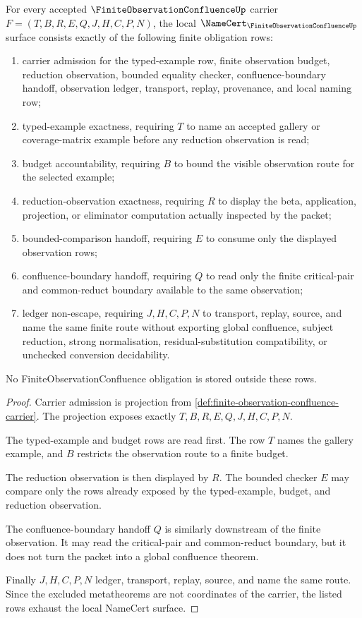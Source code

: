 \begin{theorem}
\label{thm:finite-observation-confluence-namecert-obligations}
For every accepted $\FiniteObservationConfluenceUp$ carrier $F=(T,B,R,E,Q,J,H,C,P,N)$, the local $\NameCert_{\FiniteObservationConfluenceUp}$ surface consists exactly of the following finite obligation rows:
\begin{enumerate}
\item carrier admission for the typed-example row, finite observation budget, reduction observation, bounded equality checker, confluence-boundary handoff, observation ledger, transport, replay, provenance, and local naming row;
\item typed-example exactness, requiring $T$ to name an accepted gallery or coverage-matrix example before any reduction observation is read;
\item budget accountability, requiring $B$ to bound the visible observation route for the selected example;
\item reduction-observation exactness, requiring $R$ to display the beta, application, projection, or eliminator computation actually inspected by the packet;
\item bounded-comparison handoff, requiring $E$ to consume only the displayed observation rows;
\item confluence-boundary handoff, requiring $Q$ to read only the finite critical-pair and common-reduct boundary available to the same observation;
\item ledger non-escape, requiring $J,H,C,P,N$ to transport, replay, source, and name the same finite route without exporting global confluence, subject reduction, strong normalisation, residual-substitution compatibility, or unchecked conversion decidability.
\end{enumerate}
No FiniteObservationConfluence obligation is stored outside these rows.
\end{theorem}
\begin{proof}
Carrier admission is projection from \autoref{def:finite-observation-confluence-carrier}. The projection exposes exactly $T,B,R,E,Q,J,H,C,P,N$.

The typed-example and budget rows are read first. The row $T$ names the gallery example, and $B$ restricts the observation route to a finite budget.

The reduction observation is then displayed by $R$. The bounded checker $E$ may compare only the rows already exposed by the typed-example, budget, and reduction observation.

The confluence-boundary handoff $Q$ is similarly downstream of the finite observation. It may read the critical-pair and common-reduct boundary, but it does not turn the packet into a global confluence theorem.

Finally $J,H,C,P,N$ ledger, transport, replay, source, and name the same route. Since the excluded metatheorems are not coordinates of the carrier, the listed rows exhaust the local NameCert surface.
\end{proof}

